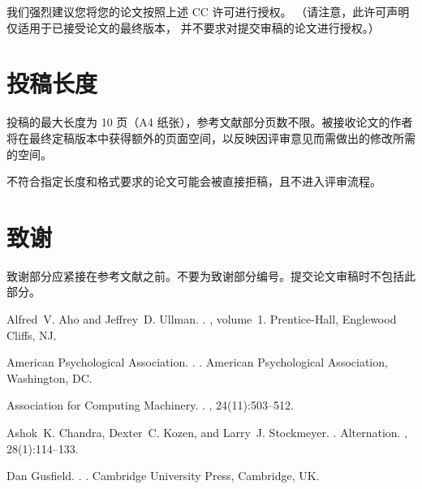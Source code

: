 \documentclass[11pt]{article}
\begin{document}
\begin{CJK*}{UTF8}{gbsn}
我们强烈建议您将您的论文按照上述 CC 许可进行授权。
（请注意，此许可声明仅适用于已接受论文的最终版本，
并不要求对提交审稿的论文进行授权。）
\section{投稿长度}
\label{sec:length}

投稿的最大长度为 10 页（A4 纸张），参考文献部分页数不限。被接收论文的作者将在最终定稿版本中获得额外的页面空间，以反映因评审意见而需做出的修改所需的空间。

不符合指定长度和格式要求的论文可能会被直接拒稿，且不进入评审流程。
\section*{致谢}

致谢部分应紧接在参考文献之前。不要为致谢部分编号。提交论文审稿时不包括此部分。

\begin{thebibliography}{}

Alfred~V. Aho and Jeffrey~D. Ullman.
.
, volume~1.
\newblock Prentice-{Hall}, Englewood Cliffs, NJ.

{American Psychological Association}.
.
.
\newblock American Psychological Association, Washington, DC.

{Association for Computing Machinery}.
.
, 24(11):503--512.

Ashok~K. Chandra, Dexter~C. Kozen, and Larry~J. Stockmeyer.
.
\newblock Alternation.
,
  28(1):114--133.

Dan Gusfield.
.
.
\newblock Cambridge University Press, Cambridge, UK.

\end{thebibliography}

\end{CJK*}
\end{document}
